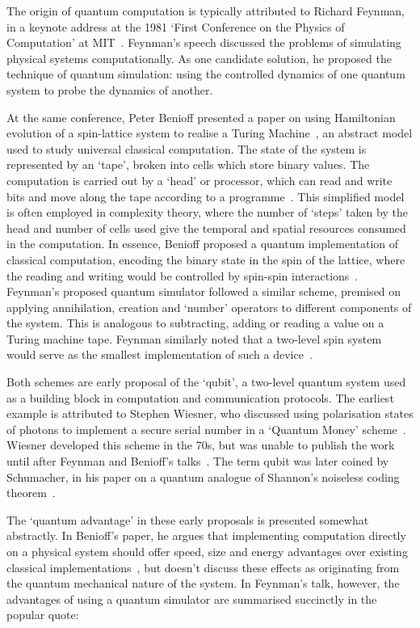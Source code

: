 \documentclass{standalone}
\begin{document}
The origin of quantum computation is typically attributed to Richard Feynman, in a keynote address at the 1981 `First Conference on the Physics of Computation' at MIT~\cite{Feynman1982}. Feynman's speech discussed the problems of simulating physical systems computationally. As one candidate solution, he proposed the technique of quantum simulation: using the controlled dynamics of one quantum system to probe the dynamics of another. 
\par
At the same conference, Peter Benioff presented a paper on using Hamiltonian evolution of a spin-lattice system to realise a Turing Machine~\cite{Benioff1986}, an abstract model used to study universal classical computation. The state of the system is represented by an `tape', broken into cells which store binary values. The computation is carried out by a `head' or processor, which can read and write bits and move along the tape according to a programme~\cite{Deutsch1985}. This simplified model is often employed in complexity theory, where the number of `steps' taken by the head and number of cells used give the temporal and spatial resources consumed in the computation.  In essence, Benioff proposed a quantum implementation of classical computation, encoding the binary state in the spin of the lattice, where the reading and writing would be controlled by spin-spin interactions~\cite{Benioff1986}.\\
Feynman's proposed quantum simulator followed a similar scheme, premised on applying annihilation, creation and `number' operators to different components of the system. This is analogous to subtracting, adding or reading a value on a Turing machine tape. Feynman similarly noted that a two-level spin system would serve as the smallest implementation of such a device~\cite{Feynman1982}.
\par
Both schemes are early proposal of the `qubit', a two-level quantum system used as a building block in computation and communication protocols. The earliest example is attributed to Stephen Wiesner, who discussed using polarisation states of photons to implement a secure serial number in a `Quantum Money' scheme~\cite{Wiesner1983}. Wiesner developed this scheme in the 70s, but was unable to publish the work until after Feynman and Benioff's talks~\cite{Brassard2006}. The term qubit was later coined by Schumacher, in his paper on a quantum analogue of Shannon's noiseless coding theorem~\cite{Schumacher1995a}.
\par
The `quantum advantage' in these early proposals is presented somewhat abstractly. In Benioff's paper, he argues that implementing computation directly on a physical system should offer speed, size and energy advantages over existing classical implementations~\cite{Benioff1986}, but doesn't discuss these effects as originating from the quantum mechanical nature of the system. In Feynman's talk, however, the advantages of using a quantum simulator are summarised succinctly in the popular quote:\\
\end{document}
